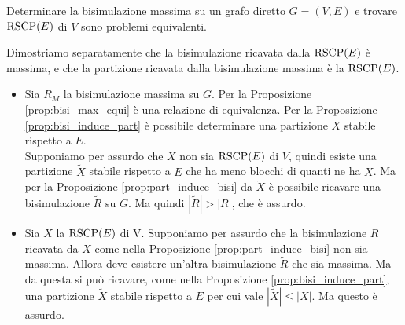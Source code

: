 \begin{corollary}
    Determinare la bisimulazione massima su un grafo diretto $G = (V,E)$ e trovare $\textup{RSCP}(E)$ di $V$ sono problemi equivalenti.
\end{corollary}
\begin{proof2}
    Dimostriamo separatamente che la bisimulazione ricavata dalla $\textup{RSCP}(E)$ è massima, e che la partizione ricavata dalla bisimulazione massima è la $\textup{RSCP}(E)$.
    \begin{itemize}
        \item Sia $R_M$ la bisimulazione massima su $G$. Per la Proposizione \ref{prop:bisi_max_equi} è una relazione di equivalenza. Per la Proposizione \ref{prop:bisi_induce_part} è possibile determinare una partizione $X$ stabile rispetto a $E$.\\
              Supponiamo per assurdo che $X$ non sia $\textup{RSCP}(E)$ di $V$, quindi esiste una partizione $\widetilde{X}$ stabile rispetto a $E$ che ha meno blocchi di quanti ne ha $X$. Ma per la Proposizione \ref{prop:part_induce_bisi} da
              $\widetilde{X}$ è possibile ricavare una bisimulazione $\widetilde{R}$ su $G$. Ma quindi $|\widetilde{R}| > |R|$, che è assurdo.
        \item Sia $X$ la $\textup{RSCP}(E)$ di V. Supponiamo per assurdo che la bisimulazione $R$ ricavata da $X$ come nella Proposizione \ref{prop:part_induce_bisi} non sia massima. Allora deve esistere un'altra bisimulazione $\widetilde{R}$ che
              sia massima. Ma da questa si può ricavare, come nella Proposizione \ref{prop:bisi_induce_part}, una partizione $\widetilde{X}$ stabile rispetto a $E$ per cui vale $|\widetilde{X}| \leq |X|$. Ma questo è assurdo.
    \end{itemize}
    \vspace*{-0.75cm}
\end{proof2}
